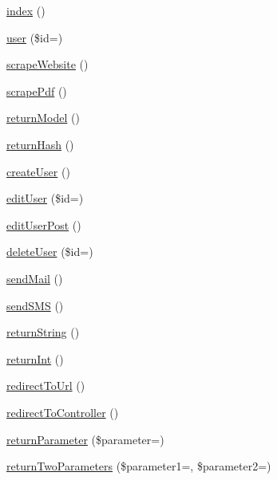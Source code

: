 \begin{DoxyCompactItemize}
\item 
\hyperlink{class_basic_a149eb92716c1084a935e04a8d95f7347}{index} ()
\item 
\hyperlink{class_basic_a6603546e99f9519b86989be128736ad6}{user} (\$id=\textquotesingle{}\textquotesingle{})
\item 
\hyperlink{class_basic_a48ffe9a27b91ce968b2bcf5e0a9d4069}{scrape\+Website} ()
\item 
\hyperlink{class_basic_a67dbb38567401c856d5361d6704874d5}{scrape\+Pdf} ()
\item 
\hyperlink{class_basic_a7cb6a02987f0faaef2ee4aff9198907e}{return\+Model} ()
\item 
\hyperlink{class_basic_a16df2136bd66a75022f350d583e6c060}{return\+Hash} ()
\item 
\hyperlink{class_basic_a967982ee98f05287bbdba812f6016947}{create\+User} ()
\item 
\hyperlink{class_basic_acd3b430aeceba0ebbda62330838d0c0b}{edit\+User} (\$id=\textquotesingle{}\textquotesingle{})
\item 
\hyperlink{class_basic_a445a1f2f42c756bf451de087e36b7193}{edit\+User\+Post} ()
\item 
\hyperlink{class_basic_a934aeeec370d904f3a58bde4d514259d}{delete\+User} (\$id=\textquotesingle{}\textquotesingle{})
\item 
\hyperlink{class_basic_a1f753d67be418d065282360fc5231d05}{send\+Mail} ()
\item 
\hyperlink{class_basic_a624b6482127c1e3ea78392e7e93db949}{send\+S\+MS} ()
\item 
\hyperlink{class_basic_a5bb666dcea19a9561c2047cfa25936bd}{return\+String} ()
\item 
\hyperlink{class_basic_a8d2918087022004ef5ad62d8f76a73d7}{return\+Int} ()
\item 
\hyperlink{class_basic_abf786273f796a96f5532dc60f9cec813}{redirect\+To\+Url} ()
\item 
\hyperlink{class_basic_a53f01fc4c43d1cecc497d9645f920407}{redirect\+To\+Controller} ()
\item 
\hyperlink{class_basic_ac380e8a432563c6affcfddd43384c1d2}{return\+Parameter} (\$parameter=\textquotesingle{}\textquotesingle{})
\item 
\hyperlink{class_basic_a2ef87b96abcca966a41e34d077fcc38e}{return\+Two\+Parameters} (\$parameter1=\textquotesingle{}\textquotesingle{}, \$parameter2=\textquotesingle{}\textquotesingle{})
\end{DoxyCompactItemize}
